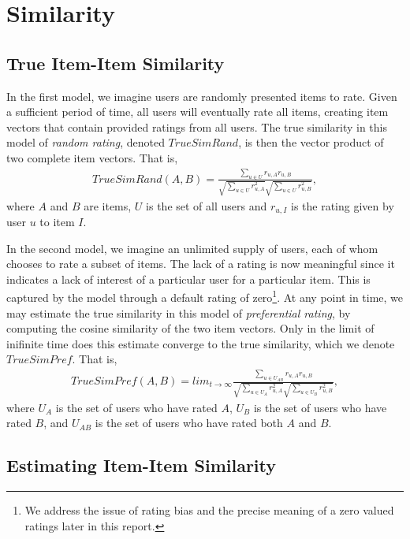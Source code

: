 \documentclass[11pt]{article}
\begin{document}
\section*{Similarity}
\subsection*{True Item-Item Similarity}

In the first model, we imagine users are randomly presented items to rate. Given
a sufficient period of time, all users will eventually rate all items, creating
item vectors that contain provided ratings from all users. The true similarity
in this model of {\em random rating}, denoted $TrueSimRand$, is then the vector
product of two complete item vectors. That is,
\begin{align}
TrueSimRand(A, B) = \frac{\sum\limits_{u\in U}
r_{u,A}r_{u,B}}{\sqrt{\sum\limits_{u\in U} r_{u,A}^2}
\sqrt{\sum\limits_{u\in U} r_{u,B}^2}},
\end{align}
where $A$ and $B$ are items, $U$ is the set of all users and $r_{u,I}$ is the 
rating given by user $u$ to item $I$.

In the second model, we imagine an unlimited supply of users, each of whom
chooses to rate a subset of items. The lack of a rating is now meaningful since
it indicates a lack of interest of a particular user for a particular item. This
is captured by the model through a default rating of zero\footnote{We address
the issue of rating bias and the precise meaning of a zero valued ratings later
in this report.}. At any point in time, we may estimate the true similarity in
this model of {\em preferential rating}, by computing the cosine similarity of
the two item vectors. Only in the limit of inifinite time does this estimate
converge to the true similarity, which we denote $TrueSimPref$.  That is,
\begin{align}
TrueSimPref(A, B) = lim_{t\to\infty}\frac{\sum\limits_{u\in U_{AB}}
r_{u,A}r_{u,B}}{\sqrt{\sum\limits_{u\in U_A} r_{u,A}^2}
\sqrt{\sum\limits_{u\in U_B} r_{u,B}^2}},
\end{align}
where $U_A$ is the set of users who have rated $A$, $U_B$ is the set of users
who have rated $B$, and $U_{AB}$ is the set of users who have rated both $A$ and
$B$.

\subsection*{Estimating Item-Item Similarity}
\end{document}
